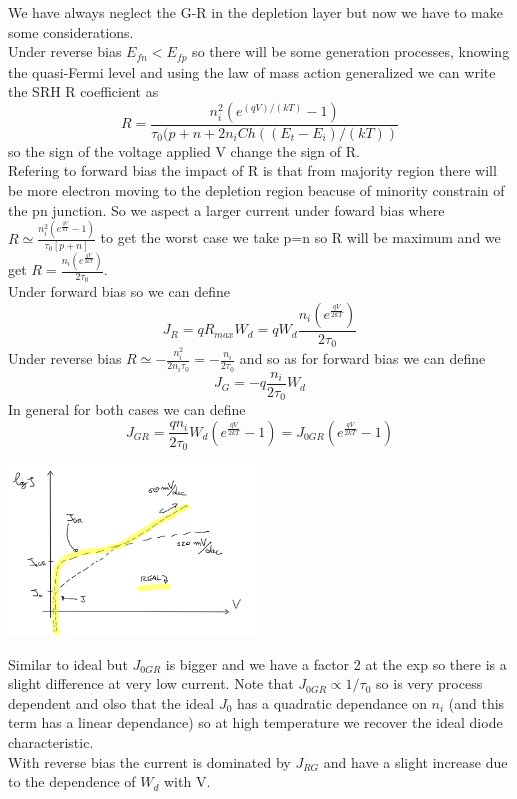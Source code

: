 We have always neglect the G-R in the depletion layer but now we have to make some considerations.\\
Under reverse bias $E_{fn}<E_{fp}$ so there will be some generation processes, knowing the quasi-Fermi level and using the law of mass action generalized we can write the SRH R coefficient as
\begin{equation}
R=\frac{n_i^2(e^{(qV)/(kT)}-1)}{\tau_0(p+n+2n_i Ch((E_t-E_i)/(kT))}
\end{equation} 
so the sign of the voltage applied V change the sign of R.\\
Refering to forward bias the impact of R is that from majority region there will be more electron moving to the depletion region beacuse of minority constrain of the pn junction. 
So we aspect a larger current under foward bias where $R\simeq \frac{n_i^2(e^{\frac{qV}{kT}}-1)}{\tau_0[p+n]}$ to get the worst case we take p=n so R will be maximum and we get $R= \frac{n_i(e^{\frac{qV}{2kT}})}{2\tau_0}$.\\
Under forward bias so we can define 
\begin{equation}
J_R=qR_{max}W_d=qW_d\frac{n_i(e^{\frac{qV}{2kT}})}{2\tau_0}
\end{equation}
Under reverse bias $R\simeq -\frac{n_i^2}{2n_i\tau_0}=-\frac{n_i}{2\tau_0}$ and so as for forward bias we can define
\begin{equation}
J_G=-q\frac{n_i}{2\tau_0}W_d
\end{equation}
In general for both cases we can define 
\begin{equation}
J_{GR}=\frac{qn_i}{2\tau_0}W_d(e^{\frac{qV}{2kT}}-1)=J_{0GR}(e^{\frac{qV}{2kT}}-1)
\end{equation}

\centering
\includegraphics[width=0.5\textwidth]{lowcurrent.png}\\
\raggedright

Similar to ideal but $J_{0GR}$ is bigger and we have a factor 2 at the exp so there is a slight difference at very low current.
Note that $J_{0GR}\propto 1/\tau_0$ so is very process dependent and olso that the ideal $J_0$ has a quadratic dependance on $n_i$ (and this term has a linear dependance) so at high temperature we recover the ideal diode characteristic.\\ 
With reverse bias the current is dominated by $J_{RG}$ and have a slight increase due to the dependence of $W_d$ with V.\\

